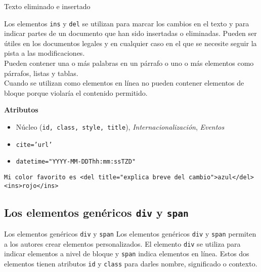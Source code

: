 \begin{frame}[fragile]{Texto eliminado e insertado} %
\footnotesize{
    Los elementos \texttt{ins} y \texttt{del} se utilizan para marcar los
    cambios en el texto y para indicar partes de un documento que han sido
    insertadas o eliminadas. Pueden ser útiles en los documentos legales y en
    cualquier caso en el que se necesite seguir la pista a las
    modificaciones.\\[0.4cm]

    Pueden contener una o más palabras en un párrafo o uno o más elementos como
    párrafos, listas y tablas. \\[0.4cm]

    Cuando se utilizan como elementos en línea no pueden contener elementos de
    bloque porque violaría el contenido permitido.

    \textbf{Atributos}
    \begin{itemize}
        \item Núcleo (\texttt{id, class, style, title}),
        \textit{Internacionalización},  \textit{Eventos}
        \item \texttt{cite='url'}
        \item \texttt{datetime="YYYY-MM-DDThh:mm:ssTZD"}
    \end{itemize}

\begin{lstlisting}
Mi color favorito es <del title="explica breve del cambio">azul</del> <ins>rojo</ins>
\end{lstlisting}
 }
\end{frame}

\subsection{Los elementos genéricos \texttt{div} y \texttt{span} } %

\begin{frame}{Los elementos genéricos \texttt{div} y \texttt{span} } %
    Los elementos genéricos \texttt{div} y \texttt{span} permiten a los autores
    crear elementos personalizados. El elemento \texttt{div} se utiliza para
    indicar elementos a nivel de bloque y \texttt{span} indica elementos en
    línea. Estos dos elementos tienen atributos \texttt{id} y \texttt{class}
    para darles nombre, significado o contexto.
\end{frame}


